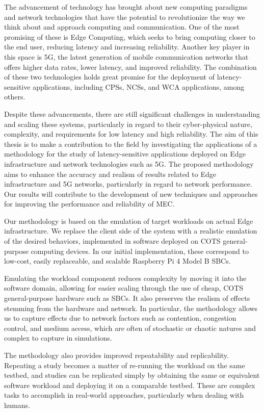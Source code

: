 The advancement of technology has brought about new computing paradigms and network technologies that have the potential to revolutionize the way we think about and approach computing and communication.
One of the most promising of these is Edge Computing, which seeks to bring computing closer to the end user, reducing latency and increasing reliability.
Another key player in this space is 5G, the latest generation of mobile communication networks that offers higher data rates, lower latency, and improved reliability.
The combination of these two technologies holds great promise for the deployment of latency-sensitive applications, including \glspl{CPS}, \glspl{NCS}, and \gls{WCA} applications, among others.

Despite these advancements, there are still significant challenges in understanding and scaling these systems, particularly in regard to their cyber-physical nature, complexity, and requirements for low latency and high reliability.
The aim of this thesis is to make a contribution to the field by investigating the applications of a methodology for the study of latency-sensitive applications deployed on Edge infrastructure and network technologies such as 5G.
The proposed methodology aims to enhance the accuracy and realism of results related to Edge infrastructure and 5G networks, particularly in regard to network performance.
Our results will contribute to the development of new techniques and approaches for improving the performance and reliability of \gls{MEC}.

Our methodology is based on the emulation of target workloads on actual Edge infrastructure.
We replace the client side of the system with a realistic emulation of the desired behaviors, implemented in software deployed on \gls{COTS} general-purpose computing devices.
In our initial implementation, these correspond to low-cost, easily replaceable, and scalable Raspberry Pi 4 Model B \glspl{SBC}.

Emulating the workload component reduces complexity by moving it into the software domain, allowing for easier scaling through the use of cheap, COTS general-purpose hardware such as \glspl{SBC}.
It also preserves the realism of effects stemming from the hardware and network.
In particular, the methodology allows us to capture effects due to network factors such as contention, congestion control, and medium access, which are often of stochastic or chaotic natures and complex to capture in simulations.

The methodology also provides improved repeatability and replicability.
Repeating a study becomes a matter of re-running the workload on the same testbed, and studies can be replicated simply by obtaining the same or equivalent software workload and deploying it on a comparable testbed.
These are complex tasks to accomplish in real-world approaches, particularly when dealing with humans.

